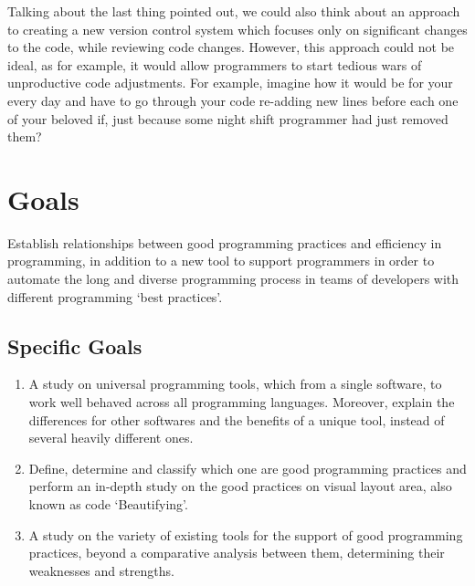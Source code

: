 \begin{englishtext}
    Talking about the last thing pointed out, we could also think about an
    approach to creating a new version control system which focuses only on
    significant changes to the code, while reviewing code changes. However, this
    approach could not be ideal, as for example, it would allow programmers to
    start tedious wars of unproductive code adjustments. For example, imagine
    how it would be for your every day and have to go through your code
    re-adding new lines before each one of your beloved if\s, just because some
    night shift programmer had just removed them?


    \cite{codePlagiarismDetection}
    \cite{softwarePortfolio}
    \cite{legacyAssets}
    \cite{massMaintenance}
    \cite{prettyPrinting}
    \cite{architectureFormatting}
    \cite{independentFramework}
    \cite{programIndentation}
    \cite{industrialApplication}
    \cite{toolsForProjectManagement}

    \section{Goals}

    Establish relationships between good programming practices and efficiency in
    programming, in addition to a new tool to support programmers in order to
    automate the long and diverse programming process in teams of developers
    with different programming `best practices'. \cite{pushdownAutomata}


    \subsection{Specific Goals}

    \begin{enumerate}
        \item A study on universal programming tools, which from a single
        software, to work well behaved across all programming languages.
        Moreover, explain the differences for other softwares and the benefits
        of a unique tool, instead of several heavily different ones.

        \item Define, determine and classify which one are good programming
        practices and perform an in-depth study on the good practices on visual
        layout area, also known as code `Beautifying'.

        \item A study on the variety of existing tools for the support of good
        programming practices, beyond a comparative analysis between them,
        determining their weaknesses and strengths.


\end{enumerate}
\end{englishtext}
